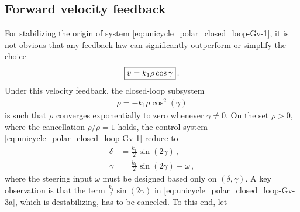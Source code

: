 \documentclass[letterpaper, 10 pt, conference]{ieeeconf}  %
\begin{document}
\subsection{Forward velocity feedback}
\label{sec:forward_velocity_feedback}
For stabilizing the origin of system \eqref{eq:unicycle_polar_closed_loop-Gv-1}, it is not obvious that any feedback law can significantly outperform or simplify the choice
\begin{equation}
\label{eq-basic-v-control}
\fbox{$v = k_1 \rho \cos\gamma$} \,.
\end{equation}
 Under this velocity feedback, the closed-loop subsystem
\begin{align}
\label{eq:unicycle_polar_closed_loop-Gv-2}
\dot{\rho} = - k_1 \rho \cos^2(\gamma)
\end{align}
is such that $\rho$ converges exponentially to zero whenever $\gamma \neq 0$. On the set $\rho>0$, where the cancellation $\rho/\rho = 1$ holds, the control system \eqref{eq:unicycle_polar_closed_loop-Gv-1} reduce to
\begin{subequations}
\label{eq:unicycle_polar_closed_loop-Gv-3}
\begin{align}
\dot{\delta} &= \frac{k_1}{2} \sin(2\gamma)\,, \label{eq:unicycle_polar_closed_loop-Gv-3n} \\
\dot{\gamma} &= \frac{k_1}{2} \sin(2\gamma) - \omega \label{eq:unicycle_polar_closed_loop-Gv-3a}\,,
\end{align}
\end{subequations}
where the steering input $\omega$ must be designed based only on $(\delta,\gamma)$.
A key observation is that the term $\frac{k_1}{2} \sin(2\gamma)$ in \eqref{eq:unicycle_polar_closed_loop-Gv-3a}, which is destabilizing, has to be canceled. To this end, let
\end{document}
